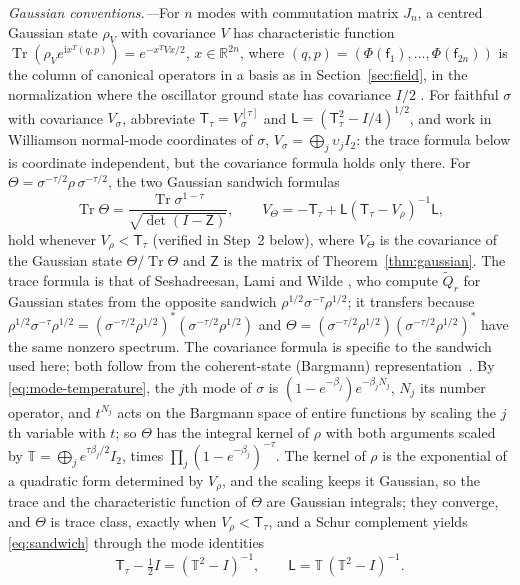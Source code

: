 \documentclass[aps,prl,reprint,longbibliography,raggedbottom]{revtex4-2}
\newcommand{\R}{\mathbb R}
\newcommand{\ii}{\mathrm i}
\DeclareMathOperator{\Tr}{Tr}
\newcommand{\Qtil}{\widetilde Q}
\newcommand{\sx}{\mathsf f}
\begin{document}
\emph{Gaussian conventions.---}For $n$ modes with commutation matrix
$J_n$, a centred Gaussian state $\rho_V$ with covariance $V$ has
characteristic function $\Tr(\rho_Ve^{\ii x^T(q,p)})=e^{-x^TVx/2}$,
$x\in\R^{2n}$, where $(q,p)=(\Phi(\sx_1),\dots,\Phi(\sx_{2n}))$ is the
column of canonical operators in a basis as in
Section~\ref{sec:field}, in the normalization where the oscillator
ground state has covariance $I/2$ \cite{SLW18}. For faithful $\sigma$ with covariance
$V_\sigma$, abbreviate $\mathsf T_\tau=V_\sigma^{[\tau]}$ and
$\mathsf L=(\mathsf T_\tau^2-I/4)^{1/2}$, and work in Williamson
normal-mode coordinates of $\sigma$, $V_\sigma=\bigoplus_j\upsilon_jI_2$:
the trace formula below is coordinate independent, but the covariance
formula holds only there. For
$\Theta=\sigma^{-\tau/2}\rho\,\sigma^{-\tau/2}$, the two Gaussian
sandwich formulas
\begin{equation}
\Tr\Theta=\frac{\Tr\sigma^{1-\tau}}{\sqrt{\det(I-\mathsf Z)}},\qquad
V_\Theta=-\mathsf T_\tau+\mathsf L(\mathsf T_\tau-V_\rho)^{-1}\mathsf L,
\label{eq:sandwich}
\end{equation}
hold whenever $V_\rho<\mathsf T_\tau$ (verified in Step~2 below),
where $V_\Theta$ is the covariance
of the Gaussian state $\Theta/\Tr\Theta$ and $\mathsf Z$ is the matrix
of Theorem~\ref{thm:gaussian}. The trace formula is that of
Seshadreesan, Lami and Wilde \cite[Theorem~22]{SLW18}, who compute
$\Qtil_r$ for Gaussian states from the opposite sandwich
$\rho^{1/2}\sigma^{-\tau}\rho^{1/2}$; it transfers because
$\rho^{1/2}\sigma^{-\tau}\rho^{1/2}=(\sigma^{-\tau/2}\rho^{1/2})^*(\sigma^{-\tau/2}\rho^{1/2})$
and $\Theta=(\sigma^{-\tau/2}\rho^{1/2})(\sigma^{-\tau/2}\rho^{1/2})^*$
have the same nonzero spectrum. The covariance formula is specific to
the sandwich used here; both follow from the coherent-state (Bargmann)
representation~\cite{Bargmann61}. By
\eqref{eq:mode-temperature}, the $j$th mode of $\sigma$ is
${(1-e^{-\beta_j})e^{-\beta_jN_j}}$, $N_j$ its number operator, and
$t^{N_j}$ acts on the Bargmann space of entire functions by scaling
the $j$th variable with $t$; so $\Theta$ has the integral kernel of
$\rho$ with both arguments scaled by
$\mathbb T=\bigoplus_je^{\tau\beta_j/2}I_2$, times
$\prod_j(1-e^{-\beta_j})^{-\tau}$. The kernel of $\rho$ is the exponential
of a quadratic form determined by $V_\rho$, and the scaling keeps it
Gaussian, so the trace and the characteristic function of $\Theta$ are
Gaussian integrals; they converge, and $\Theta$ is trace class,
exactly when $V_\rho<\mathsf T_\tau$, and a Schur complement yields
\eqref{eq:sandwich} through the mode identities
\[
\mathsf T_\tau-\tfrac12I=(\mathbb T^2-I)^{-1},\qquad
\mathsf L=\mathbb T\,(\mathbb T^2-I)^{-1}.
\]
\end{document}
